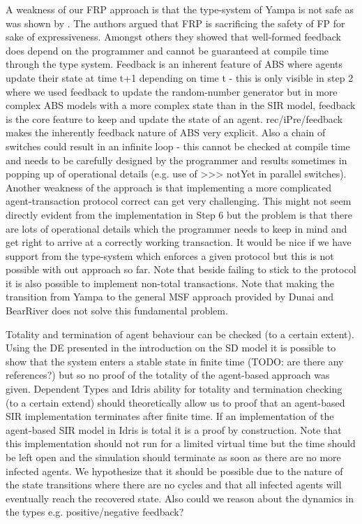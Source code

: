 A weakness of our FRP approach is that the type-system of Yampa is not safe as was shown by \cite{sculthorpe_safe_2009}. The authors argued that FRP is sacrificing the safety of FP for sake of expressiveness. Amongst others they showed that well-formed feedback does depend on the programmer and cannot be guaranteed at compile time through the type system. Feedback is an inherent feature of ABS where agents update their state at time t+1 depending on time t - this is only visible in step 2 where we used feedback to update the random-number generator but in more complex ABS models with a more complex state than in the SIR model, feedback is the core feature to keep and update the state of an agent.  rec/iPre/feedback makes the inherently feedback nature of ABS very explicit. Also a chain of switches could result in an infinite loop - this cannot be checked at compile time and needs to be carefully designed by the programmer and results sometimes in popping up of operational details (e.g. use of >>> notYet in parallel switches). 
Another weakness of the approach is that implementing a more complicated agent-transaction protocol correct can get very challenging. This might not seem directly evident from the implementation in Step 6 but the problem is that there are lots of operational details which the programmer needs to keep in mind and get right to arrive at a correctly working transaction. It would be nice if we have support from the type-system which enforces a given protocol but this is not possible with out approach so far. Note that beside failing to stick to the protocol it is also possible to implement non-total transactions.
Note that making the transition from Yampa to the general MSF approach provided by Dunai and BearRiver does not solve this fundamental problem.


Totality and termination of agent behaviour can be checked (to a certain extent). Using the DE presented in the introduction on the SD model it is possible to show that the system enters a stable state in finite time (TODO: are there any references?) but so no proof of the totality of the agent-based approach was given. Dependent Types and Idris ability for totality and termination checking (to a certain extend) should theoretically allow us to proof that an agent-based SIR implementation terminates after finite time. If an implementation of the agent-based SIR model in Idris is total it is a proof by construction. Note that this implementation should not run for a limited virtual time but the time should be left open and the simulation should terminate as soon as there are no more infected agents. We hypothesize that it should be possible due to the nature of the state transitions where there are no cycles and that all infected agents will eventually reach the recovered state. Also could we reason about the dynamics in the types e.g. positive/negative feedback?


